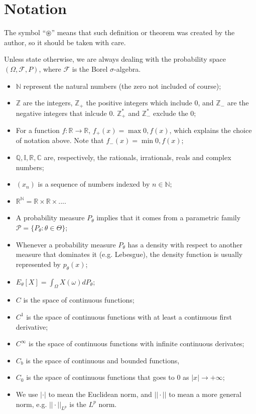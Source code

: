 \chapter*{Notation}

The symbol ``$\circledast$'' means that such definition or theorem was
created by the author, so it should be taken with care.

Unless state otherwise,
we are always dealing with the probability space $(\Omega, \mathcal F, P)$, where
$\mathcal F$ is the Borel $\sigma$-algebra.

\begin{itemize}
	\item $\mathbb N$ represent the natural numbers (the zero not included of course);
	\item $\mathbb Z$ are the integers, $\mathbb Z_+$ the positive integers which include $0$, and
	      $\mathbb Z_-$ are the negative integers that inlcude $0$. $\mathbb Z_+^*$ and $\mathbb Z_-^*$ exclude the $0$;
	\item For a function $f:\mathbb R \to \mathbb R$, $f_+(x) = \max{0,f(x)}$, which explains the choice of notation above.
	      Note that $f_-(x) = \min{0,f(x)}$;
	\item $\mathbb Q, \mathbb I, \mathbb R, \mathbb C$ are, respectively, the rationals, irrationals, reals
	      and complex numbers;
	\item $(x_n)$ is a sequence of numbers indexed by $n \in \mathbb N$;
	\item $\mathbb R^{\mathbb N} = \mathbb R \times \mathbb R \times ...$.
\end{itemize}

\begin{itemize}
	\item A probability measure $P_\theta$ implies that it comes from a parametric family
	      $\mathcal P = \{P_\theta : \theta \in \Theta\}$;
	\item Whenever a probability measure $P_\theta$ has a density with respect
	      to another measure that dominates it (e.g. Lebesgue), the density function is
	      usually represented by $p_\theta(x)$;
	\item $E_\theta [X] = \int_\Omega X(\omega) dP_\theta$;
	\item $C$ is the space of continuous functions;
	\item $C^1$ is the space of continuous functions with at least a continuous first derivative;
	\item $C^{\infty}$ is the space of continuous functions with infinite continuous derivates;
	\item $C_b$ is the space of continuous and bounded functions,
	\item $C_0$ is the space of continuous functions that goes to $0$ as $|x| \to +\infty$;
	\item We use $|\cdot|$ to mean the Euclidean norm, and $||\cdot||$ to mean a more
	      general norm, e.g. $||\cdot||_{L^p}$ is the $L^p$ norm.
\end{itemize}

